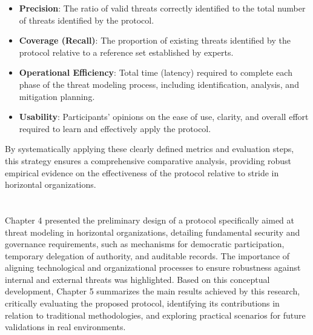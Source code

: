 \begin{itemize}
\item \textbf{Precision}: The ratio of valid threats correctly identified to the
total number of threats identified by the protocol.
\item \textbf{Coverage (Recall)}: The proportion of existing threats identified
by the protocol relative to a reference set established by experts.
\item \textbf{Operational Efficiency}: Total time (latency) required to complete
each phase of the threat modeling process, including identification, analysis,
and mitigation planning.
\item \textbf{Usability}: Participants' opinions on the ease of use, clarity,
and overall effort required to learn and effectively apply the protocol.
\end{itemize}

By systematically applying these clearly defined metrics and evaluation steps,
this strategy ensures a comprehensive comparative analysis, providing robust
empirical evidence on the effectiveness of the protocol relative to \gls{stride}
in horizontal organizations.

\section*{}
Chapter 4 presented the preliminary design of a protocol specifically aimed at
threat modeling in horizontal organizations, detailing fundamental security and
governance requirements, such as mechanisms for democratic participation,
temporary delegation of authority, and auditable records. The importance of
aligning technological and organizational processes to ensure robustness against
internal and external threats was highlighted. Based on this conceptual
development, Chapter 5 summarizes the main results achieved by this research,
critically evaluating the proposed protocol, identifying its contributions in
relation to traditional methodologies, and exploring practical scenarios for
future validations in real environments.

